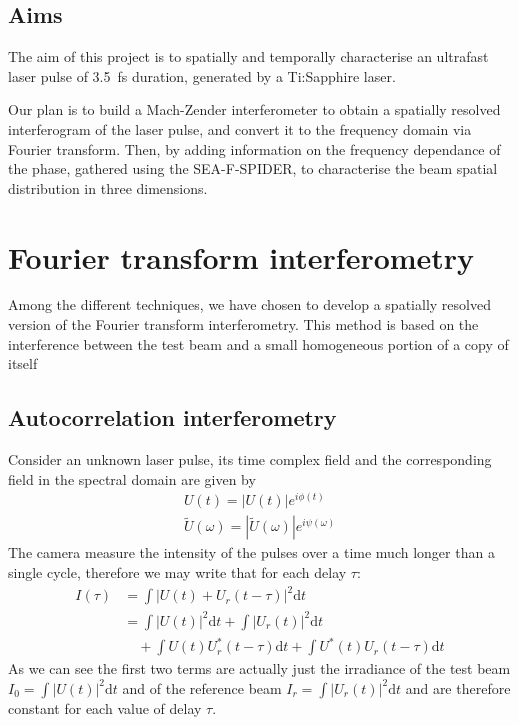 \documentclass[12pt,a4paper,twoside]{article}
\begin{document}
\subsection{Aims}
The aim of this project is to spatially and temporally characterise an ultrafast laser pulse of \SI{3.5}{\fs} duration, generated by a Ti:Sapphire laser.

Our plan is to build a Mach-Zender interferometer to obtain a spatially resolved interferogram of the laser pulse, and convert it to the frequency domain via Fourier transform.
Then, by adding information on the frequency dependance of the phase, gathered using the SEA-F-SPIDER, to characterise the beam spatial distribution in three dimensions.

\section{Fourier transform interferometry}
Among the different techniques, we have chosen to develop a spatially resolved version of the Fourier transform interferometry.
This method is based on the interference between the test beam and a small homogeneous portion of a copy of itself
\subsection{Autocorrelation interferometry}
Consider an unknown laser pulse, its time complex field and the corresponding field in the spectral domain are given by
\begin{gather}
	U(t) = |U(t)|e^{i\phi(t)} \\
	\tilde{U}(\omega) = |\tilde{U}(\omega)|e^{i\psi(\omega)}
	\label{eq_def}
\end{gather}
The camera measure the intensity of the pulses over a time much longer than a single cycle, therefore we may write that for each delay $\tau$:
\begin{align}
	I(\tau) 	&= \int|U(t)+U_r(t-\tau)|^2\mathrm{d}t \\
			&= \int|U(t)|^2\mathrm{d}t + \int|U_r(t)|^2\mathrm{d}t\\
			&\quad + \int U(t)U_r^*(t-\tau)\mathrm{d}t + \int U^*(t)U_r(t-\tau)\mathrm{d}t 
	\label{eq_autocorr}
\end{align}
As we can see the first two terms are actually just the irradiance of the test beam $I_0 = \int|U(t)|^2\mathrm{d}t$ and of the reference beam $I_r = \int|U_r(t)|^2\mathrm{d}t$ and are therefore constant for each value of delay $\tau$.
\end{document}
